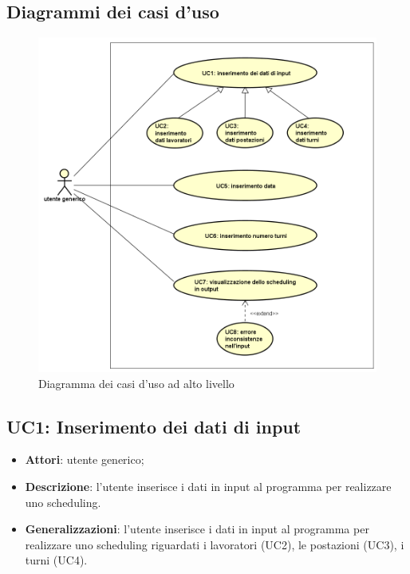 \subsection{Diagrammi dei casi d'uso}
\begin{figure}[!h]
    \begin{widepage}
        \includegraphics[width=17cm,keepaspectratio]{../immagini/usecase/System.png}
        \caption{Diagramma dei casi d'uso ad alto livello}
    \end{widepage}
\end{figure}
\clearpage
\subsection{UC1: Inserimento dei dati di input}
\label{UC1}
\begin{itemize}
    \item \textbf{Attori}: utente generico;
    \item \textbf{Descrizione}: l'utente inserisce i dati in input al programma per realizzare uno scheduling.
    \item \textbf{Generalizzazioni}: l'utente inserisce i dati in input al programma per realizzare uno scheduling riguardati i lavoratori (UC2), le postazioni (UC3), i turni (UC4).
\end{itemize}

